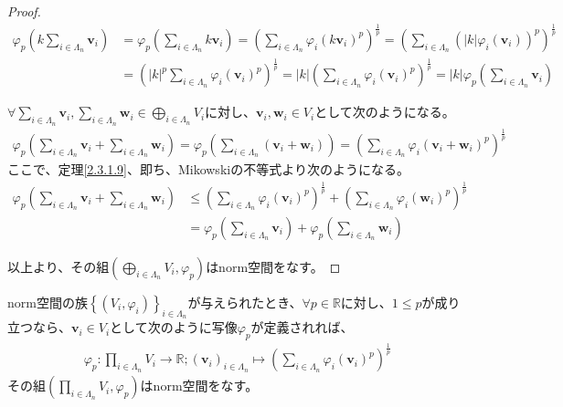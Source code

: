 \documentclass[dvipdfmx]{jsarticle}
\begin{document}
\begin{proof}
\begin{align*}
\varphi_{p}\left( k\sum_{i \in \varLambda_{n}} \mathbf{v}_{i} \right) &= \varphi_{p}\left( \sum_{i \in \varLambda_{n}} {k\mathbf{v}_{i}} \right) = \left( \sum_{i \in \varLambda_{n}} {\varphi_{i}\left( k\mathbf{v}_{i} \right)}^{p} \right)^{\frac{1}{p}} = \left( \sum_{i \in \varLambda_{n}} \left( |k|\varphi_{i}\left( \mathbf{v}_{i} \right) \right)^{p} \right)^{\frac{1}{p}}\\
&= \left( |k|^{p}\sum_{i \in \varLambda_{n}} {\varphi_{i}\left( \mathbf{v}_{i} \right)}^{p} \right)^{\frac{1}{p}} = |k|\left( \sum_{i \in \varLambda_{n}} {\varphi_{i}\left( \mathbf{v}_{i} \right)}^{p} \right)^{\frac{1}{p}} = |k|\varphi_{p}\left( \sum_{i \in \varLambda_{n}} \mathbf{v}_{i} \right)
\end{align*}\par
$\forall\sum_{i \in \varLambda_{n}} \mathbf{v}_{i},\sum_{i \in \varLambda_{n}} \mathbf{w}_{i} \in \bigoplus_{i \in \varLambda_{n}} V_{i}$に対し、$\mathbf{v}_{i},\mathbf{w}_{i} \in V_{i}$として次のようになる。
\begin{align*}
\varphi_{p}\left( \sum_{i \in \varLambda_{n}} \mathbf{v}_{i} + \sum_{i \in \varLambda_{n}} \mathbf{w}_{i} \right) = \varphi_{p}\left( \sum_{i \in \varLambda_{n}} \left( \mathbf{v}_{i} + \mathbf{w}_{i} \right) \right) = \left( \sum_{i \in \varLambda_{n}} {\varphi_{i}\left( \mathbf{v}_{i} + \mathbf{w}_{i} \right)}^{p} \right)^{\frac{1}{p}}
\end{align*}
ここで、定理\ref{2.3.1.9}、即ち、Mikowskiの不等式より次のようになる。
\begin{align*}
\varphi_{p}\left( \sum_{i \in \varLambda_{n}} \mathbf{v}_{i} + \sum_{i \in \varLambda_{n}} \mathbf{w}_{i} \right) &\leq \left( \sum_{i \in \varLambda_{n}} {\varphi_{i}\left( \mathbf{v}_{i} \right)}^{p} \right)^{\frac{1}{p}} + \left( \sum_{i \in \varLambda_{n}} {\varphi_{i}\left( \mathbf{w}_{i} \right)}^{p} \right)^{\frac{1}{p}}\\
&= \varphi_{p}\left( \sum_{i \in \varLambda_{n}} \mathbf{v}_{i} \right) + \varphi_{p}\left( \sum_{i \in \varLambda_{n}} \mathbf{w}_{i} \right)
\end{align*}\par
以上より、その組$\left( \bigoplus_{i \in \varLambda_{n}} V_{i},\varphi_{p} \right)$はnorm空間をなす。
\end{proof}
\begin{thm}\label{2.3.1.11}
norm空間の族$\left\{ \left( V_{i},\varphi_{i} \right) \right\}_{i \in \varLambda_{n}}$が与えられたとき、$\forall p \in \mathbb{R}$に対し、$1 \leq p$が成り立つなら、$\mathbf{v}_{i} \in V_{i}$として次のように写像$\varphi_{p}$が定義されれば、
\begin{align*}
\varphi_{p}:\prod_{i \in \varLambda_{n}} V_{i} \rightarrow \mathbb{R};\left( \mathbf{v}_{i} \right)_{i \in \varLambda_{n}} \mapsto \left( \sum_{i \in \varLambda_{n}} {\varphi_{i}\left( \mathbf{v}_{i} \right)}^{p} \right)^{\frac{1}{p}}
\end{align*}
その組$\left( \prod_{i \in \varLambda_{n}} V_{i},\varphi_{p} \right)$はnorm空間をなす。
\end{thm}
\end{document}
